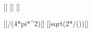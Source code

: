 [\W]
[\m]
[\V\per\m]

[]{\PeX/(4*pi*\rX^2)}[\W\per\m\squared]
[]{sqrt(2*\IaX/(\nccX*\ncepsX))}[\V\per\m]
